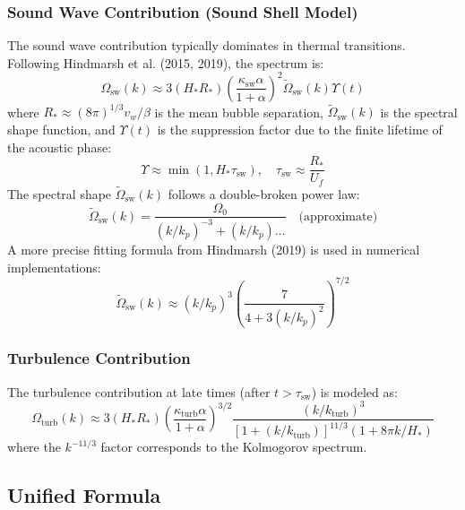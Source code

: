 \documentclass{article}
\begin{document}
\subsubsection{Sound Wave Contribution (Sound Shell Model)}
The sound wave contribution typically dominates in thermal transitions. Following Hindmarsh et al. (2015, 2019), the spectrum is:
\begin{equation}
    \Omega_{\text{sw}}(k) \approx 3 (H_* R_*) \left( \frac{\kappa_{\text{sw}} \alpha}{1 + \alpha} \right)^2 \tilde{\Omega}_{\text{sw}}(k) \Upsilon(t)
\end{equation}
where $R_* \approx (8\pi)^{1/3} v_w / \beta$ is the mean bubble separation, $\tilde{\Omega}_{\text{sw}}(k)$ is the spectral shape function, and $\Upsilon(t)$ is the suppression factor due to the finite lifetime of the acoustic phase:
\begin{equation}
    \Upsilon \approx \min(1, H_* \tau_{\text{sw}}), \quad \tau_{\text{sw}} \approx \frac{R_*}{U_f}
\end{equation}
The spectral shape $\tilde{\Omega}_{\text{sw}}(k)$ follows a double-broken power law:
\begin{equation}
    \tilde{\Omega}_{\text{sw}}(k) = \frac{\Omega_0}{(k/k_p)^{-3} + (k/k_p) \dots} \quad \text{(approximate)}
\end{equation}
A more precise fitting formula from Hindmarsh (2019) is used in numerical implementations:
\begin{equation}
    \tilde{\Omega}_{\text{sw}}(k) \approx (k/k_p)^3 \left( \frac{7}{4 + 3 (k/k_p)^2} \right)^{7/2}
\end{equation}

\subsubsection{Turbulence Contribution}
The turbulence contribution at late times (after $t > \tau_{\text{sw}}$) is modeled as:
\begin{equation}
    \Omega_{\text{turb}}(k) \approx 3 (H_* R_*) \left( \frac{\kappa_{\text{turb}} \alpha}{1 + \alpha} \right)^{3/2} \frac{(k/k_{\text{turb}})^3}{[1 + (k/k_{\text{turb}})]^{11/3} (1 + 8\pi k / H_*)}
\end{equation}
where the $k^{-11/3}$ factor corresponds to the Kolmogorov spectrum.

\subsection{Unified Formula}
\end{document}
